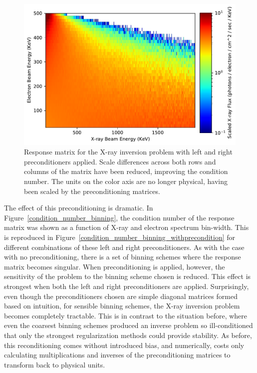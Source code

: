 \begin{figure}[p]
    \centering
    \includegraphics[width=1.1\textwidth]{figures/chapter_4/matrix_scaling_plot/fig1.pdf}
    \caption{Response matrix for the X-ray inversion problem with left and right preconditioners applied. Scale differences across both rows and columns of the matrix have been reduced, improving the condition number. The units on the color axis are no longer physical, having been scaled by the preconditioning matrices.}
    \label{matrix_scaling_plot_transformed}
\end{figure}

The effect of this preconditioning is dramatic. In Figure~\ref{condition_number_binning}, the condition number of the response matrix was shown as a function of X-ray and electron spectrum bin-width. This is reproduced in Figure~\ref{condition_number_binning_withprecondition} for different combinations of these left and right preconditioners. As with the case with no preconditioning, there is a set of binning schemes where the response matrix becomes singular. When preconditioning is applied, however, the sensitivity of the problem to the binning scheme chosen is reduced. This effect is strongest when both the left and right preconditioners are applied. Surprisingly, even though the preconditioners chosen are simple diagonal matrices formed based on intuition, for sensible binning schemes, the X-ray inversion problem becomes completely tractable. This is in contrast to the situation before, where even the coarsest binning schemes produced an inverse problem so ill-conditioned that only the strongest regularization methods could provide stability. As before, this reconditioning comes without introduced bias, and numerically, costs only calculating multiplications and inverses of the preconditioning matrices to transform back to physical units. 

